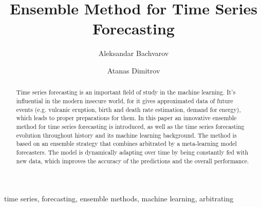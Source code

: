 \documentclass[runningheads,a4paper]{llncs}[2015/06/24]
\begin{document}
\title{Ensemble Method for Time Series Forecasting}

\author{Aleksandar Bachvarov \and Atanas Dimitrov}

%
\iffalse
\author{Firstname Lastname\inst{1} \and Firstname Lastname\inst{2} }

\institute{
Insitute 1\\
\email{...}\and
Insitute 2\\
\email{...}
}
\fi
			
\maketitle

\begin{abstract}
Time series forecasting is an important field of study in the machine learning. It's influential in the modern insecure world, for it gives approximated data of future events (e.g. vulcanic eruption, birth and death rate estimation, demand for energy), which leads to proper preparations for them. In this paper an innovative ensemble method for time series forecasting is introduced, as well as the time series forecasting evolution throughout history and its machine learning background. The method is based on an ensemble strategy that combines arbitrated by a meta-learning model forecasters. The model is dynamically adapting over time by being constantly fed with new data, which improves the accuracy of the predictions and the overall performance.
\end{abstract}

\begin{keywords}
time series, forecasting, ensemble methods, machine learning, arbitrating  
\end{keywords}
\end{document}
